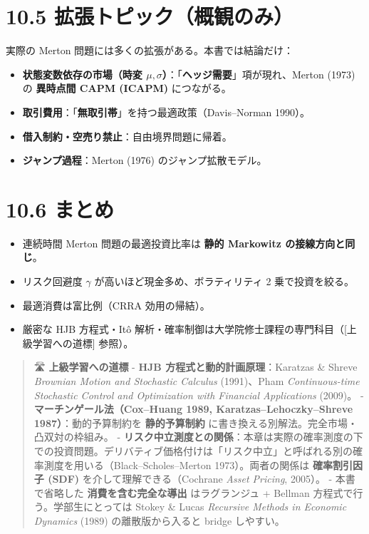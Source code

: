 \documentclass[11pt,a4paper]{report}
\begin{document}
\section{10.5 拡張トピック（概観のみ）}

実際の Merton 問題には多くの拡張がある。本書では結論だけ：

\begin{itemize}
\item \textbf{状態変数依存の市場（時変 $\mu, \sigma$）}：「\textbf{ヘッジ需要}」項が現れ、Merton (1973) の \textbf{異時点間 CAPM (ICAPM)} につながる。
\item \textbf{取引費用}：「\textbf{無取引帯}」を持つ最適政策（Davis–Norman 1990）。
\item \textbf{借入制約・空売り禁止}：自由境界問題に帰着。
\item \textbf{ジャンプ過程}：Merton (1976) のジャンプ拡散モデル。
\end{itemize}

\section{10.6 まとめ}

\begin{itemize}
\item 連続時間 Merton 問題の最適投資比率は \textbf{静的 Markowitz の接線方向と同じ}。
\item リスク回避度 $\gamma$ が高いほど現金多め、ボラティリティ 2 乗で投資を絞る。
\item 最適消費は富比例（CRRA 効用の帰結）。
\item 厳密な HJB 方程式・Itô 解析・確率制御は大学院修士課程の専門科目（[上級学習への道標] 参照）。
\end{itemize}

\begin{quote}
🛣 \textbf{上級学習への道標}
- \textbf{HJB 方程式と動的計画原理}：Karatzas \& Shreve \emph{Brownian Motion and Stochastic Calculus} (1991)、Pham \emph{Continuous-time Stochastic Control and Optimization with Financial Applications} (2009)。
- \textbf{マーチンゲール法（Cox–Huang 1989, Karatzas–Lehoczky–Shreve 1987）}：動的予算制約を \textbf{静的予算制約} に書き換える別解法。完全市場・凸双対の枠組み。
- \textbf{リスク中立測度との関係}：本章は実際の確率測度の下での投資問題。デリバティブ価格付けは「リスク中立」と呼ばれる別の確率測度を用いる（Black–Scholes–Merton 1973）。両者の関係は \textbf{確率割引因子 (SDF)} を介して理解できる（Cochrane \emph{Asset Pricing}, 2005）。
- 本書で省略した \textbf{消費を含む完全な導出} はラグランジュ + Bellman 方程式で行う。学部生にとっては Stokey \& Lucas \emph{Recursive Methods in Economic Dynamics} (1989) の離散版から入ると bridge しやすい。
\end{quote}
\end{document}
